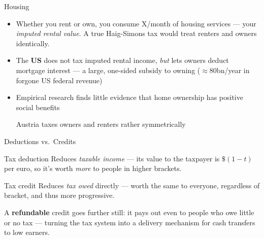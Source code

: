 \documentclass[11pt,aspectratio=169]{beamer}
\begin{document}
\begin{frame}{Housing}
  \footnotesize
  \begin{itemize}
    \item Whether you rent or own, you consume \texteuro{}X/month of housing services --- your \emph{imputed rental value}. A true Haig-Simons tax would treat renters and owners identically.
    \item The \textbf{US} does not tax imputed rental income, \emph{but} lets owners deduct mortgage interest --- a large, one-sided subsidy to owning (\(\approx\)\texteuro{}80bn/year in forgone US federal revenue)
    \item Empirical research finds little evidence that home ownership has positive social benefits

    Austria   taxes owners and renters rather symmetrically  
 
  \end{itemize}
\end{frame}

\begin{frame}{Deductions vs.\ Credits}
  \begin{block}{Tax deduction}
    Reduces \emph{taxable income} --- its value to the taxpayer is \(\$(1-t)\) per euro, so it's worth \emph{more} to people in higher brackets.
  \end{block}
  \begin{block}{Tax credit}
    Reduces \emph{tax owed} directly --- worth the same to everyone, regardless of bracket, and thus more progressive.
  \end{block}
  \vspace{0.3em}
   
  A \textbf{refundable} credit goes further still: it pays out even to people who owe little or no tax --- turning the tax system into a delivery mechanism for cash transfers to low earners.
\end{frame}
\end{document}

